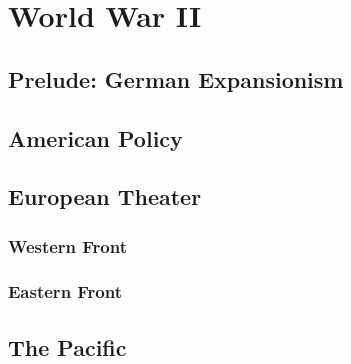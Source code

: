 \chapter{World War II}

\section{Prelude: German Expansionism}

\section{American Policy}

\section{European Theater}

\subsection*{Western Front}

\subsection*{Eastern Front}

\section{The Pacific}
